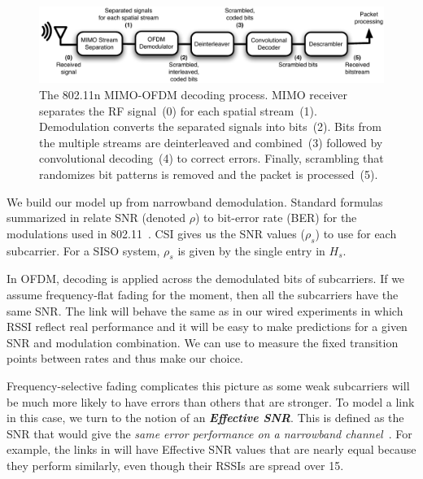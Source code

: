 \begin{figure}[ht!]
\centering
\includegraphics[width=6in]{figures/mimo_ofdm_decoding_process.pdf}
\caption{\label{fig:ofdm_decoding} The 802.11n MIMO-OFDM decoding process. MIMO receiver separates the RF signal~(0) for each spatial stream~(1). Demodulation converts the separated signals into bits~(2). Bits from the multiple streams are deinterleaved and combined~(3) followed by convolutional decoding~(4) to correct errors. Finally, scrambling that randomizes bit patterns is removed and the packet is processed~(5).}
\end{figure}

We build our model up from narrowband demodulation. 
Standard formulas summarized in  relate SNR (denoted $\rho$) to bit-error rate (BER) for the modulations used in 802.11~\cite{Goldsmith}. CSI gives us the SNR values ($\rho_s$) to use for each subcarrier. For a SISO system, $\rho_s$ is given by the single entry in $H_s$.

In OFDM, decoding is applied across the demodulated bits of subcarriers. If we assume frequency-flat fading for the moment, then all the subcarriers have the same SNR\@. The link will behave the same as in our wired experiments in which RSSI reflect real performance and it will be easy to make predictions for a given SNR and modulation combination. We can use  to measure the fixed transition points between rates and thus make our choice.

Frequency-selective fading complicates this picture as some weak subcarriers will be much more likely to have errors than others that are stronger. To model a link in this case, we turn to the notion of an \textbf{\em Effective SNR}. This is defined as the SNR that would give the \emph{same error performance on a narrowband channel}~\cite{nanda_effectiveSNR}. For example, the links in  will have Effective SNR values that are nearly equal because they perform similarly, even though their RSSIs are spread over 15\dB.

